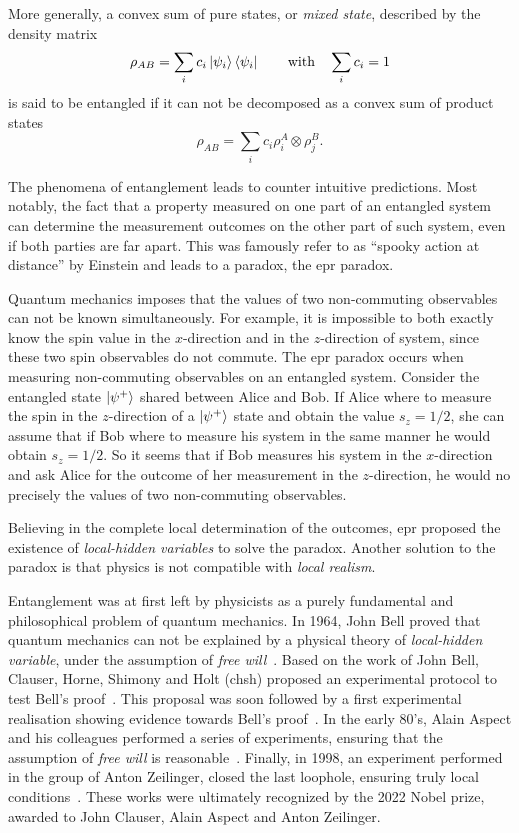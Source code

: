 More generally, a convex sum of pure states, or \textit{mixed state}, described by the density matrix
\begin{equation}
	\rho_{AB} = \sum_i c_i \ket{\psi_i} \bra{\psi_i} \qquad \text{with} \quad \sum_i c_i = 1
	\label{eq:mixed_state}
\end{equation}
is said to be entangled if it can not be decomposed as a convex sum of product states
\begin{equation}
	\rho_{AB} = \sum_i c_i \rho^A_i \otimes \rho^B_j.
	\label{eq:product_state}
\end{equation}

\medbreak
The phenomena of entanglement leads to counter intuitive predictions. 
Most notably, the fact that a property measured on one part of an entangled system can determine the measurement outcomes on the other part of such system, even if both parties are far apart. 
This was famously refer to as \enquote{spooky action at distance} by Einstein and leads to a paradox, the \acrshort{epr} paradox.

Quantum mechanics imposes that the values of two non-commuting observables can not be known simultaneously. 
For example, it is impossible to both exactly know the spin value in the $x$-direction and in the $z$-direction of system, since these two spin observables do not commute.
The \acrshort{epr} paradox occurs when measuring non-commuting observables on an entangled system.
Consider the entangled state $\ket{\psi^+}$ shared between Alice and Bob.
If Alice where to measure the spin in the $z$-direction of a $\ket{\psi^+}$ state and obtain the value $s_z = 1/2$, she can assume that if Bob where to measure his system in the same manner he would obtain $s_z = 1/2$. 
So it seems that if Bob measures his system in the $x$-direction and ask Alice for the outcome of her measurement in the $z$-direction, he would no precisely the values of two non-commuting observables.

Believing in the complete local determination of the outcomes, \acrlong{epr} proposed the existence of \textit{local-hidden variables} to solve the paradox. Another solution to the paradox is that physics is not compatible with \textit{local realism}.

\medbreak
Entanglement was at first left by physicists as a purely fundamental and philosophical problem of quantum mechanics.
In 1964, John Bell proved that quantum mechanics can not be explained by a physical theory of \textit{local-hidden variable}, under the assumption of \textit{free will}~\cite{Bell1964}. 
Based on the work of John Bell, Clauser, Horne, Shimony and Holt (\acrshort{chsh}) proposed an experimental protocol to test Bell's proof~\cite{Clauser1969}. 
This proposal was soon followed by a first experimental realisation showing evidence towards Bell's proof~\cite{Freedman1972}.
In the early 80's, Alain Aspect and his colleagues performed a series of experiments, ensuring that the assumption of \textit{free will} is reasonable~\cite{Aspect1982}.
Finally, in 1998, an experiment performed in the group of Anton Zeilinger, closed the last loophole, ensuring truly local conditions~\cite{Weihs1998}.
These works were ultimately recognized by the 2022 Nobel prize, awarded to John Clauser, Alain Aspect and Anton Zeilinger.

